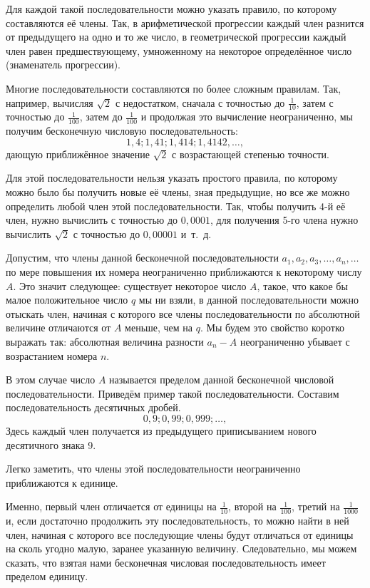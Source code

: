 \documentclass[oneside]{book}
\begin{document}
Для каждой такой последовательности можно указать правило, по которому составляются её члены.
Так, в арифметической прогрессии каждый член разнится от предыдущего на одно и то же число, в геометрической прогрессии каждый член равен предшествующему, умноженному на некоторое определённое число (знаменатель прогрессии).

Многие последовательности составляются по более сложным правилам.
Так, например, вычисляя $\sqrt{2}$ с недостатком, сначала с точностью до $\tfrac1{10}$, затем с точностью до $\tfrac1{100}$, затем до $\tfrac1{100}$ и продолжая это вычисление неограниченно, мы получим бесконечную числовую последовательность:
\[1{,}4;
1{,}41;
1{,}414;
1{,}4142,\dots,\]
дающую приближённое значение  $\sqrt{2}$  с возрастающей степенью точности.

Для этой последовательности нельзя указать простого правила, по которому можно было бы получить новые её члены, зная предыдущие, но все же можно определить любой член этой последовательности.
Так, чтобы получить 4-й её член, нужно вычислить с точностью до $0{,}0001$, для получения 5-го члена нужно вычислить  $\sqrt{2}$  с точностью до $0{,}00001$ и~т.~д.

Допустим, что члены данной бесконечной последовательности $a_1, a_2, a_3, \dots, a_n,\dots$ по мере повышения их номера неограниченно приближаются к некоторому числу $A$.
Это значит следующее:
существует некоторое число $A$, такое, что какое бы малое положительное число $q$ мы ни взяли, в данной последовательности можно отыскать член, начиная с которого все члены последовательности по абсолютной величине отличаются от $A$ меньше, чем на $q$.
Мы будем это свойство коротко выражать так:
 абсолютная величина разности $a_n-A$
неограниченно убывает с возрастанием номера $n$.

В этом случае число $A$ называется пределом данной бесконечной числовой последовательности.
Приведём пример такой последовательности.
Составим последовательность десятичных дробей.
\[0{,}9;
0{,}99;
0{,}999;\dots,\]
Здесь каждый член получается из предыдущего приписыванием нового десятичного знака 9.

Легко заметить, что члены этой последовательности неограниченно приближаются к единице.

Именно, первый член отличается от единицы на $\tfrac1{10}$, 
второй на $\tfrac1{100}$, третий на $\tfrac1{1000}$ и, если достаточно продолжить эту последовательность, то можно найти в ней член, начиная с которого все последующие члены будут отличаться от единицы на сколь угодно малую, заранее указанную величину.
Следовательно, мы можем сказать, что взятая нами бесконечная числовая последовательность имеет пределом единицу.
\end{document}
